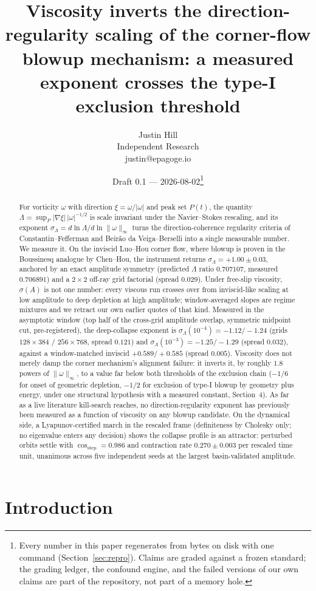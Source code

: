 \documentclass[11pt]{article}
\title{Viscosity inverts the direction-regularity scaling of the
corner-flow blowup mechanism: a measured exponent crosses the type-I
exclusion threshold}
\author{Justin Hill\\ \small Independent Research \\ \small justin@epagoge.io}
\date{Draft 0.1 --- 2026-08-02\thanks{Every number in this paper
regenerates from bytes on disk with one command (Section~\ref{sec:repro}).
Claims are graded against a frozen standard; the grading ledger, the
confound engine, and the failed versions of our own claims are part of the
repository, not part of a memory hole.}}
\newcommand{\om}{\omega}
\newcommand{\vinf}{\|\om\|_\infty}
\newcommand{\Lam}{\Lambda}
\newcommand{\sL}{\sigma_{\!\Lambda}}
\begin{document}
\maketitle

\begin{abstract}
For vorticity $\om$ with direction $\xi=\om/|\om|$ and peak set $P(t)$, the
quantity $\Lam=\sup_P |\nabla\xi|\,|\om|^{-1/2}$ is scale invariant under
the Navier--Stokes rescaling, and its exponent
$\sL = d\ln\Lam / d\ln\vinf$ turns the direction-coherence regularity
criteria of Constantin--Fefferman and Beir\~ao da Veiga--Berselli into a
single measurable number. We measure it. On the inviscid Luo--Hou corner
flow, where blowup is proven in the Boussinesq analogue by Chen--Hou, the
instrument returns $\sL=+1.00\pm0.03$, anchored by an exact amplitude
symmetry (predicted $\Lam$ ratio $0.707107$, measured $0.706891$) and a
$2\times2$ off-ray grid factorial (spread $0.029$). Under free-slip
viscosity, $\sigma(A)$ is not one number: every viscous run crosses over
from inviscid-like scaling at low amplitude to deep depletion at high
amplitude; window-averaged slopes are regime mixtures and we retract our
own earlier quotes of that kind. Measured in the asymptotic window
(top half of the cross-grid amplitude overlap, symmetric midpoint cut,
pre-registered), the deep-collapse exponent is
$\sL(10^{-4})=-1.12/-1.24$ (grids $128\times384$ / $256\times768$, spread
$0.121$) and $\sL(10^{-3})=-1.25/-1.29$ (spread $0.032$), against a
window-matched inviscid $+0.589/+0.585$ (spread $0.005$). Viscosity does
not merely damp the corner mechanism's alignment failure: it inverts it,
by roughly $1.8$ powers of $\vinf$, to a value far below both thresholds
of the exclusion chain ($-1/6$ for onset of geometric depletion, $-1/2$
for exclusion of type-I blowup by geometry plus energy, under one
structural hypothesis with a measured constant, Section~4). As far as a
live literature kill-search reaches, no direction-regularity exponent has
previously been measured as a function of viscosity on any blowup
candidate. On the dynamical side, a Lyapunov-certified march in the
rescaled frame (definiteness by Cholesky only; no eigenvalue enters any
decision) shows the collapse profile is an attractor: perturbed orbits
settle with $\cos_{\mathrm{step}}=0.986$ and contraction rate
$0.270\pm0.003$ per rescaled time unit, unanimous across five independent
seeds at the largest basin-validated amplitude.
\end{abstract}

\section{Introduction}\label{sec:intro}
\end{document}
